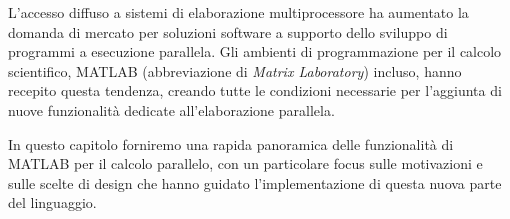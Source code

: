 L'accesso diffuso a sistemi di elaborazione multiprocessore ha aumentato
la domanda di mercato per soluzioni software a supporto dello sviluppo di programmi a esecuzione parallela. \newline
Gli ambienti di programmazione per il calcolo scientifico, MATLAB (abbreviazione di \textit{Matrix Laboratory}) incluso, hanno recepito questa tendenza,
creando tutte le condizioni necessarie per l'aggiunta di nuove funzionalit\`a dedicate all'elaborazione parallela.

In questo capitolo forniremo una rapida panoramica delle funzionalit\`a di MATLAB per il calcolo parallelo,
con un particolare focus sulle motivazioni e sulle scelte di design che hanno guidato l'implementazione di questa nuova parte del linguaggio.